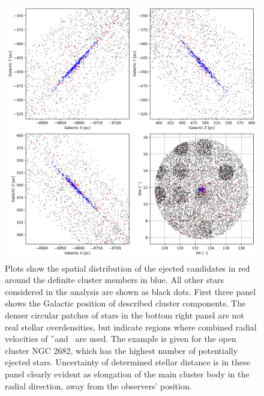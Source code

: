 \begin{figure}
	\centering
	\includegraphics[width=\textwidth]{NGC_2682_possible_ejected-step1.png}
	\caption{Plots show the spatial distribution of the ejected candidates in red around the definite cluster members in blue. All other stars considered in the analysis are shown as black dots. First three panel shows the Galactic position of described cluster components. The denser circular patches of stars in the bottom right panel are not real stellar overdensities, but indicate regions where combined radial velocities of \G\ and \Gh\ are used. The example is given for the open cluster NGC 2682, which has the highest number of potentially ejected stars. Uncertainty of determined stellar distance is in these panel clearly evident as elongation of the main cluster body in the radial direction, away from the observers' position.}
	\label{fig:ejected_around_cluster}
\end{figure}

